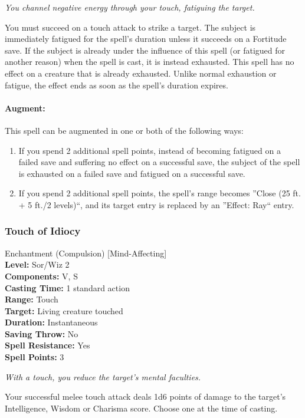 \emph{You channel negative energy through your touch, fatiguing the target.}

You must succeed on a touch attack to strike a target.
The subject is immediately fatigued for the spell's duration unless it succeeds on a Fortitude save.
If the subject is already under the influence of this spell (or fatigued for another reason) when the spell is cast, it is instead exhausted.
This spell has no effect on a creature that is already exhausted. 
Unlike normal exhaustion or fatigue, the effect ends as soon as the spell's duration expires.

\paragraph{Augment:} This spell can be augmented in one or both of the following ways:
\begin{enumerate}
 \item If you spend 2 additional spell points, instead of becoming fatigued on a failed save and suffering no effect on a successful save,
 the subject of the spell is exhausted on a failed save and fatigued on a successful save.
 \item If you spend 2 additional spell points, the spell's range becomes ''Close (25 ft. + 5 ft./2 levels)``, and its target entry is replaced
 by an ''Effect: Ray`` entry.
\end{enumerate}
\subsubsection{Touch of Idiocy}
\label{Spell:TouchOfIdiocy}
Enchantment (Compulsion) [Mind-Affecting]
\\ \textbf{Level:} Sor/Wiz 2
\\ \textbf{Components:} V, S
\\ \textbf{Casting Time:} 1 standard action
\\ \textbf{Range:} Touch
\\ \textbf{Target:} Living creature touched
\\ \textbf{Duration:} Instantaneous
\\ \textbf{Saving Throw:} No
\\ \textbf{Spell Resistance:} Yes
\\ \textbf{Spell Points:} 3

\emph{With a touch, you reduce the target's mental faculties. }

Your successful melee touch attack deals 1d6 points of damage to the target's Intelligence, Wisdom or Charisma score. 
Choose one at the time of casting.

